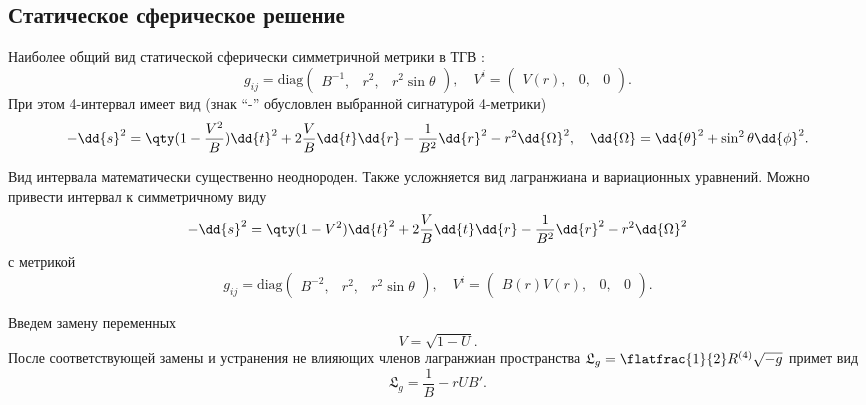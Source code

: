 \documentclass[\docroot/reports/draft/report.tex]{subfiles}
\begin{document}
\onlyinsubfile{\tableofcontents}

\subsection{Статическое сферическое решение}

    Наиболее общий вид статической сферически симметричной метрики в ТГВ \cite{burlankov_space_dynamics,burlankov_new_phys}:
    \begin{equation*}
        g_{ij} = \text{diag} \begin{pmatrix}B^{-1}, & r^2, & r^2 \sin\theta\end{pmatrix} , \quad
        V^i = \begin{pmatrix}V(r), & 0, & 0\end{pmatrix} .
    \end{equation*}
    При этом 4-интервал имеет вид (знак \enquote{-} обусловлен выбранной сигнатурой 4-метрики)
    \begin{equation*}
        - \dd{s}^2 = \qty(1 - \frac{V^2}{B}) \dd{t}^2 + 2 \frac{V}{B} \dd{t} \dd{r} - \frac{1}{B^2} \dd{r}^2 - r^2 \dd{\Omega}^2 , \quad \dd{\Omega} = \dd{\theta}^2 + \sin^2{\theta} \dd{\phi}^2 .
    \end{equation*}

    Вид интервала математически существенно неоднороден. Также усложняется вид лагранжиана и вариационных уравнений. Можно привести интервал к симметричному виду
    \begin{equation*}
        - \dd{s}^2 = \qty(1 - V^2) \dd{t}^2 + 2 \frac{V}{B} \dd{t} \dd{r} - \frac{1}{B^2} \dd{r}^2 - r^2 \dd{\Omega}^2
    \end{equation*}
    с метрикой
    \begin{equation*}
        g_{ij} = \text{diag} \begin{pmatrix}B^{-2}, & r^2, & r^2 \sin\theta\end{pmatrix} , \quad
        V^i = \begin{pmatrix}B(r)V(r), & 0, & 0\end{pmatrix} .
    \end{equation*}

    Введем замену переменных
    \begin{equation*}
        V = \sqrt{1 - U} .
    \end{equation*}
    После соответствующей замены и устранения не влияющих членов лагранжиан пространства $\mathfrak{L}_g = \flatfrac{1}{2} R^{(4)} \sqrt{-g}$ примет вид
    \begin{equation*}
        \mathfrak{L}_g = \frac{1}{B} - r U B' .
    \end{equation*}
\end{document}
